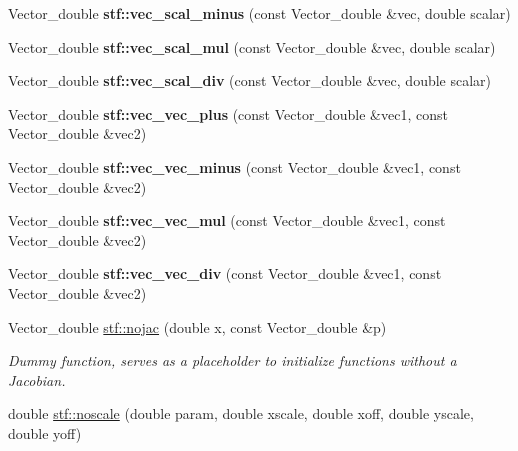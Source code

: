 \begin{DoxyCompactItemize}
\item 
\hypertarget{group__stfgen_ga635ebb6f8676ca855fe93b83028efafc}{
Vector\_\-double {\bfseries stf::vec\_\-scal\_\-minus} (const Vector\_\-double \&vec, double scalar)}
\label{group__stfgen_ga635ebb6f8676ca855fe93b83028efafc}

\item 
\hypertarget{group__stfgen_ga1d3019104e48837b3e73441bf3c114f8}{
Vector\_\-double {\bfseries stf::vec\_\-scal\_\-mul} (const Vector\_\-double \&vec, double scalar)}
\label{group__stfgen_ga1d3019104e48837b3e73441bf3c114f8}

\item 
\hypertarget{group__stfgen_ga2b8a0bf817a5cae1752bd5f5adb1b6bc}{
Vector\_\-double {\bfseries stf::vec\_\-scal\_\-div} (const Vector\_\-double \&vec, double scalar)}
\label{group__stfgen_ga2b8a0bf817a5cae1752bd5f5adb1b6bc}

\item 
\hypertarget{group__stfgen_ga51d7332f01697cfc06f2bd5b52c52f15}{
Vector\_\-double {\bfseries stf::vec\_\-vec\_\-plus} (const Vector\_\-double \&vec1, const Vector\_\-double \&vec2)}
\label{group__stfgen_ga51d7332f01697cfc06f2bd5b52c52f15}

\item 
\hypertarget{group__stfgen_ga9c715d4f5927507dc34eaeeea0840968}{
Vector\_\-double {\bfseries stf::vec\_\-vec\_\-minus} (const Vector\_\-double \&vec1, const Vector\_\-double \&vec2)}
\label{group__stfgen_ga9c715d4f5927507dc34eaeeea0840968}

\item 
\hypertarget{group__stfgen_ga1ee73a2a48f6d19a94e77fe33d8fd664}{
Vector\_\-double {\bfseries stf::vec\_\-vec\_\-mul} (const Vector\_\-double \&vec1, const Vector\_\-double \&vec2)}
\label{group__stfgen_ga1ee73a2a48f6d19a94e77fe33d8fd664}

\item 
\hypertarget{group__stfgen_gaa34bbc6c34b76d8f2d7ec80f6afc9164}{
Vector\_\-double {\bfseries stf::vec\_\-vec\_\-div} (const Vector\_\-double \&vec1, const Vector\_\-double \&vec2)}
\label{group__stfgen_gaa34bbc6c34b76d8f2d7ec80f6afc9164}

\item 
\hypertarget{group__stfgen_ga0dd74b65e47d94acfc41705c9c4dd872}{
Vector\_\-double \hyperlink{group__stfgen_ga0dd74b65e47d94acfc41705c9c4dd872}{stf::nojac} (double x, const Vector\_\-double \&p)}
\label{group__stfgen_ga0dd74b65e47d94acfc41705c9c4dd872}

\begin{DoxyCompactList}\small\item\em Dummy function, serves as a placeholder to initialize functions without a Jacobian. \item\end{DoxyCompactList}\item 
\hypertarget{group__stfgen_gafdb0668b03431e76286bbf94363d70bc}{
double \hyperlink{group__stfgen_gafdb0668b03431e76286bbf94363d70bc}{stf::noscale} (double param, double xscale, double xoff, double yscale, double yoff)}
\label{group__stfgen_gafdb0668b03431e76286bbf94363d70bc}


\end{DoxyCompactItemize}
